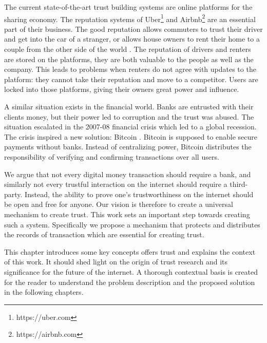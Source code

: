 The current state-of-the-art trust building systems are online platforms for the sharing economy.
The reputation systems of Uber\footnote{https://uber.com} and Airbnb\footnote{https://airbnb.com} are
an essential part of their business. The good reputation allows commuters to trust their driver and
get into the car of a stranger, or allows house owners to rent their home to a couple from the other
side of the world \cite{ert2016trust}. The reputation of drivers and renters are stored on the platforms, they are both
valuable to the people as well as the company. This leads to problems when renters do not agree with
updates to the platform: they cannot take their reputation and move to a competitor. Users are locked
into those platforms, giving their owners great power and influence.

A similar situation exists in the financial world. Banks are entrusted with their clients money, but 
their power led to corruption and the trust was abused. \cite{financial_crisis} The situation escalated in the 2007-08 
financial crisis which led to a global recession. The crisis inspired a new solution: Bitcoin \cite{nakamoto2008bitcoin}. Bitcoin
is supposed to enable secure payments without banks. Instead of centralizing power, Bitcoin distributes
the responsibility of verifying and confirming transactions over all users.

We argue that not every digital money transaction should require a bank, and similarly not every trustful
interaction on the internet should require a third-party. Instead, the ability to prove one's trustworthiness
on the internet should be open and free for anyone. Our vision is therefore to create a universal
mechanism to create trust. This work sets an important 
step towards creating such a system. Specifically we propose a mechanism that protects and 
distributes the records of transaction which are essential for creating trust. 

This chapter introduces some key concepts offers trust and explains the context of this work.
It should shed light on the origin of trust research and its significance for the future of the 
internet. A thorough contextual basis is created for the reader to understand the problem description
and the proposed solution in the following chapters.

